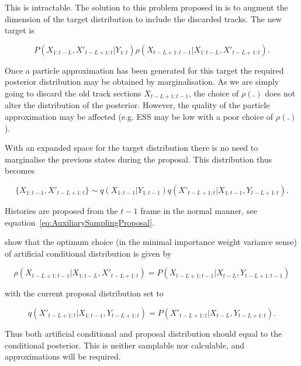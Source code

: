 This is intractable. The solution to this problem proposed in \cite{Doucet2006} is to augment the dimension of the target distribution to include the discarded tracks. The new target is

\begin{equation}
P(X_{1:t-L}, X'_{t-L+1:t}|Y_{1:t}) \rho(X_{t-L+1:t-1}|X_{1:t-L}, X'_{t-L+1:t}).
\label{eq:FLTarget}
\end{equation}

Once a particle approximation has been generated for this target the required posterior distribution may be obtained by marginalisation. As we are simply going to discard the old track sections $X_{t-L+1:t-1}$, the choice of $\rho(.)$ does not alter the distribution of the posterior. However, the quality of the particle approximation may be affected (e.g. ESS may be low with a poor choice of $\rho(.)$).

With an expanded space for the target distribution there is no need to marginalise the previous states during the proposal. This distribution thus becomes

\begin{equation}
\{X_{1:t-1}, X'_{t-L+1:t}\} \sim q(X_{1:t-1}|Y_{1:t-1}) q(X'_{t-L+1:t}|X_{1:t-1}, Y_{t-L+1:t}).
\label{eq:ExtendedFLProposal}
\end{equation}

Histories are proposed from the $t-1$ frame in the normal manner, see equation~\ref{eq:AuxiliarySamplingProposal}.

\cite{Doucet2006} show that the optimum choice (in the minimal importance weight variance sense) of artificial conditional distribution is given by 

\begin{equation}
\rho(X_{t-L+1:t-1}|X_{1:t-L}, X'_{t-L+1:t}) = P(X_{t-L+1:t-1}|X_{t-L}, Y_{t-L+1:t-1})
\end{equation}

with the current proposal distribution set to

\begin{equation}
q(X'_{t-L+1:t}|X_{1:t-1}, Y_{t-L+1:t}) = P(X'_{t-L+1:t}|X_{t-L}, Y_{t-L+1:t}).
\end{equation}

Thus both artificial conditional and proposal distribution should equal to the conditional posterior. This is neither samplable nor calculable, and approximations will be required.